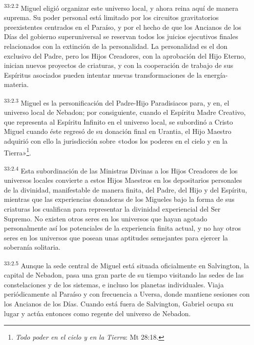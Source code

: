 \par
\textsuperscript{33:2.2} Miguel eligió organizar este universo local, y ahora reina aquí de manera suprema. Su poder personal está limitado por los circuitos gravitatorios preexistentes centrados en el Paraíso, y por el hecho de que los Ancianos de los Días del gobierno superuniversal se reservan todos los juicios ejecutivos finales relacionados con la extinción de la personalidad. La personalidad es el don exclusivo del Padre, pero los Hijos Creadores, con la aprobación del Hijo Eterno, inician nuevos proyectos de criaturas, y con la cooperación de trabajo de sus Espíritus asociados pueden intentar nuevas transformaciones de la energía-materia.

\par
\textsuperscript{33:2.3} Miguel es la personificación del Padre-Hijo Paradisiacos para, y en, el universo local de Nebadon; por consiguiente, cuando el Espíritu Madre Creativo, que representa al Espíritu Infinito en el universo local, se subordinó a Cristo Miguel cuando éste regresó de su donación final en Urantia, el Hijo Maestro adquirió con ello la jurisdicción sobre «todos los poderes en el cielo y en la Tierra»\footnote{\textit{Todo poder en el cielo y en la Tierra}: Mt 28:18.}.

\par
\textsuperscript{33:2.4} Esta subordinación de las Ministras Divinas a los Hijos Creadores de los universos locales convierte a estos Hijos Maestros en los depositarios personales de la divinidad, manifestable de manera finita, del Padre, del Hijo y del Espíritu, mientras que las experiencias donadoras de los Migueles bajo la forma de sus criaturas los cualifican para representar la divinidad experiencial del Ser Supremo. No existen otros seres en los universos que hayan agotado personalmente así los potenciales de la experiencia finita actual, y no hay otros seres en los universos que posean unas aptitudes semejantes para ejercer la soberanía solitaria.

\par
\textsuperscript{33:2.5} Aunque la sede central de Miguel está situada oficialmente en Salvington, la capital de Nebadon, pasa una gran parte de su tiempo visitando las sedes de las constelaciones y de los sistemas, e incluso los planetas individuales. Viaja periódicamente al Paraíso y con frecuencia a Uversa, donde mantiene sesiones con los Ancianos de los Días. Cuando está fuera de Salvington, Gabriel ocupa su lugar y actúa entonces como regente del universo de Nebadon.

